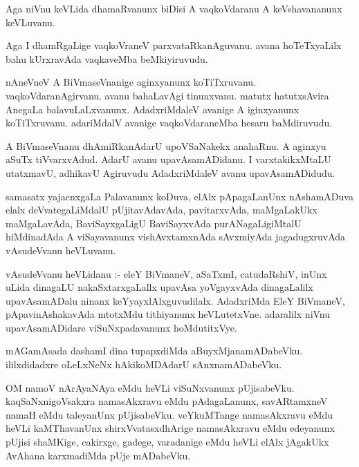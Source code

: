 \documentclass{article}
\begin{document}
\begin{mn}
Aga niVnu  keVLida  dhamaRvanunx  biDisi  A  vaqkoVdaranu  A  keVshavananunx  keVLuvanu.  
\end{mn}

\begin{mn}
Aga  I  dhamRgaLige  vaqkoVraneV  parxvataRkanAguvanu.  avana  hoTeTxyaLilx  bahu  kUrxravAda  
vaqkaveMba  beMkiyiruvudu.  
\end{mn}

\begin{mn}
nAneVneV  A  BiVmaseVnanige  aginxyanunx  koTiTxruvanu.  vaqkoVdaranAgirvanu.  avanu  bahaLavAgi  tinunxvanu.  
matutx  hatutxsAvira  AnegaLa  balavuLaLxvanunx.  AdadxriMdaleV avanige  A  iginxyanunx  koTiTxruvanu.  
adariMdalV  avanige  vaqkoVdaraneMba  hesaru  baMdiruvudu.  
\end{mn}

\begin{mn}
A  BiVmaseVnanu  dhAmiRkanAdarU  upoVSaNakekx  anahaRnu.  A  aginxyu  aSuTx  tiVvarxvAdud.  AdarU  avanu  
upavAsamADidanu.  I varxtakikxMtaLU  utatxmavU,  adhikavU  Agiruvudu  AdadxriMdaleV  avanu  upavAsamADidudu.
\end{mn}

\begin{mn}
samasatx  yajacnxgaLa  Palavanunx  koDuva,  elAlx  pApagaLanUnx  nAshamADuva  elalx  deVvategaLiMdalU  
pUjitavAdavAda,  pavitarxvAda,  maMgaLakUkx  maMgaLavAda,  BaviSayxgaLigU  BaviSayxvAda  purANagaLigiMtalU  
hiMdinadAda  A  viSayavanunx  vishAvxtamxnAda  sAvxmiyAda  jagadugxruvAda  vAsudeVvanu  heVLuvanu.
\end{mn}
  
\begin{mn}
vAsudeVvanu  heVLidanu :- eleY  BiVmaneV,  aSaTxmI, catudaRshiV,  inUnx  uLida  dinagaLU  nakaSxtarxgaLallx  
upavAsa  yoVgayxvAda  dinagaLalilx  upavAsamADalu  ninanx  keYyayxlAlxguvudilalx.  AdadxriMda  EleY  
BiVmaneV,  pApavinAshakavAda  mtotxMdu  tithiyanunx  heVLutetxVne.  adaralilx  niVnu  upavAsamADidare  
viSuNxpadavanunx  hoMdutitxVye.  
\end{mn}

\begin{mn}
mAGamAsada  dashamI  dina  tupapxdiMda  aBuyxMjanamADabeVku.  ililxdidadxre  oLeLxNeNx  hAkikoMDAdarU  sAnxnamADabeVku.
\end{mn}

\begin{mn}
OM  namoV  nArAyaNAya  eMdu  heVLi  viSuNxvanunx  pUjisabeVku.  kaqSaNxnigoVsakxra  namasAkxravu  eMdu  
pAdagaLanunx,  savARtamxneV  namaH  eMdu  taleyanUnx  pUjisabeVku.  veYkuMTange  namasAkxravu  eMdu  
heVLi  kaMThavanUnx  shirxVvatasxdhArige  namasAkxravu  eMdu  edeyanunx  pUjisi  shaMKige,  cakirxge,  
gadege,  varadanige  eMdu  heVLi  elAlx  jAgakUkx  AvAhana  karxmadiMda  pUje  mADabeVku.
\end{mn}
\end{document}

